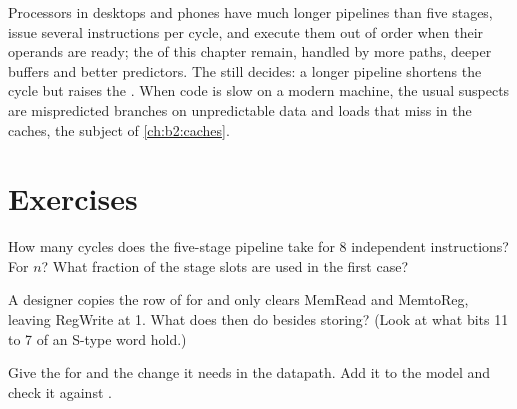 
\begin{inpractice}
Processors in desktops and phones have much longer pipelines than five stages, issue several instructions per cycle,
and execute them out of order when their operands are ready; the  of this chapter remain, handled by more
 paths, deeper buffers and better predictors. The  still decides: a longer pipeline
shortens the cycle but raises the . When code is slow on a modern machine, the usual suspects
are mispredicted branches on unpredictable data and loads that miss in the caches, the subject of
\cref{ch:b2:caches}.
\end{inpractice}

\section{Exercises}\label{sec:b2:processor-and-pipelining:exercises}

\begin{exercise}[$\star$]\label{exo:b2:processor-and-pipelining:1}
How many cycles does the five-stage pipeline take for 8 independent instructions? For $n$? What fraction of the
stage slots are used in the first case?
\end{exercise}

\begin{exercise}[$\star$]\label{exo:b2:processor-and-pipelining:2}
A designer copies the row of  for  and only clears MemRead and MemtoReg, leaving RegWrite at 1.
What does  then do besides storing? (Look at what bits 11 to 7 of an S-type word hold.)
\end{exercise}

\begin{exercise}[$\star$]\label{exo:b2:processor-and-pipelining:3}
Give the  for  and the change it needs in the datapath. Add it to the model and check it
against .
\end{exercise}

